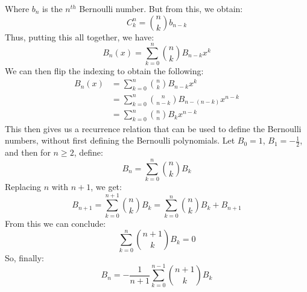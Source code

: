             Where $b_{n}$ is the $n^{th}$ Bernoulli number.
            But from this, we obtain:
            \begin{equation}
                C_{k}^{n}=\binom{n}{k}b_{n-k}
            \end{equation}
            Thus, putting this all together, we have:
            \begin{equation}
                B_{n}(x)=\sum_{k=0}^{n}
                \binom{n}{k}B_{n-k}x^{k}
            \end{equation}
            We can then flip the indexing to obtain the following:
            \begin{align}
                B_{n}(x)&=
                \sum_{k=0}^{n}\binom{n}{k}B_{n-k}x^{k}\\
                &=\sum_{k=0}^{n}\binom{n}{n-k}
                B_{n-(n-k)}x^{n-k}\\
                &=\sum_{k=0}^{n}\binom{n}{n}B_{k}x^{n-k}
            \end{align}
            This then gives us a recurrence relation that can be
            used to define the Bernoulli numbers, without first
            defining the Bernoulli polynomials. Let
            $B_{0}=1$, $B_{1}=-\frac{1}{2}$, and then for
            $n\geq{2}$, define:
            \begin{equation}
                B_{n}=\sum_{k=0}^{n}
                \binom{n}{k}B_{k}
            \end{equation}
            Replacing $n$ with $n+1$, we get:
            \begin{equation}
                B_{n+1}=\sum_{k=0}^{n+1}
                \binom{n}{k}B_{k}
                =\sum_{k=0}^{n}
                \binom{n}{k}B_{k}+B_{n+1}
            \end{equation}
            From this we can conclude:
            \begin{equation}
                \sum_{k=0}^{n}\binom{n+1}{k}B_{k}=0
            \end{equation}
            So, finally:
            \begin{equation}
                B_{n}=-\frac{1}{n+1}\sum_{k=0}^{n-1}
                \binom{n+1}{k}B_{k}
            \end{equation}
